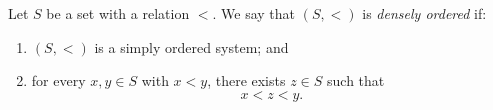 \begin{definition}
\label{def:densely-ordered-system}
Let $S$ be a set with a relation $<$. We say that $(S,<)$ is
\emph{densely ordered} if:
\begin{enumerate}
  \item $(S,<)$ is a simply ordered system; and
  \item for every $x,y\in S$ with $x<y$, there exists $z\in S$ such that
  \[
  x<z<y.
  \]
\end{enumerate}
\end{definition}
